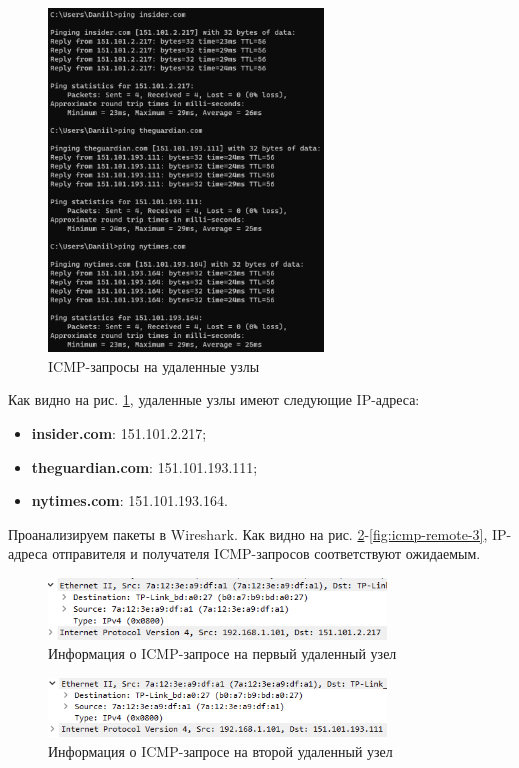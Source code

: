 \documentclass[a4paper, 14pt]{extarticle}
\begin{document}
\begin{figure}[H]
  \centering
  \includegraphics[width=0.65\textwidth]{images/ping-remote.png}
  \caption{ICMP-запросы на удаленные узлы}
  \label{fig:ping-remote}
\end{figure}

Как видно на рис. \ref{fig:ping-remote}, удаленные узлы имеют следующие
IP-адреса:
\begin{itemize}
  \item \textbf{insider.com}: 151.101.2.217;
  \item \textbf{theguardian.com}: 151.101.193.111;
  \item \textbf{nytimes.com}: 151.101.193.164.
\end{itemize}
Проанализируем пакеты в Wireshark. Как видно на рис.
\ref{fig:icmp-remote-1}-\ref{fig:icmp-remote-3}, IP-адреса отправителя и
получателя ICMP-запросов соответствуют ожидаемым. 

\begin{figure}[H]
  \centering
  \includegraphics[width=0.8\textwidth]{images/icmp-remote-1.png}
  \caption{Информация о ICMP-запросе на первый удаленный узел}
  \label{fig:icmp-remote-1}
\end{figure}

\begin{figure}[H]
  \centering
  \includegraphics[width=0.8\textwidth]{images/icmp-remote-2.png}
  \caption{Информация о ICMP-запросе на второй удаленный узел}
  \label{fig:icmp-remote-2}
\end{figure}
\end{document}
